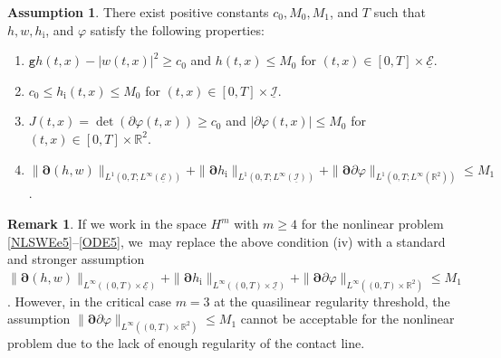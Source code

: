 \documentclass[JEP,XML,SOM,Unicode,NoFloatCountersInSection,published]{cedram}
\newenvironment{enumeratei}
{\bgroup\def\theenumi{\roman{enumi}}\def\theenumii{\arabic{enumii}}\begin{enumerate}}
{\end{enumerate}\egroup}
\newcommand{\gr}{{\mathtt g}}
\newcommand{\R}{{\mathbb R}}
\newcommand{\cI}{{\mathcal I}}
\newcommand{\cE}{{\mathcal E}}
\newcommand{\ul}[1]{\underline{#1}}
\theoremstyle{definition}
\newtheorem{assumption}[theorem]{Assumption}
\newtheorem{remark}[theorem]{Remark}
\begin{document}
\begin{assumption}\label{ass:LP}
There exist positive constants $c_0, M_0,M_1$, and $T$ such that $h,w,h_\mathrm{i}$, and $\varphi$ satisfy the following properties:
\begin{enumeratei}
\item\label{ass:LPi}
$\gr h(t,x)-|w(t,x)|^2\geq c_0$ and $h(t,x)\leq M_0$ for $(t,x)\in[0,T]\times\ul{\cE}$.
\item\label{ass:LPii}
$c_0 \leq h_\mathrm{i}(t,x) \leq M_0$ for $(t,x)\in[0,T]\times\ul{\cI}$.
\item\label{ass:LPiii}
$J(t,x)=\det(\partial\varphi(t,x))\geq c_0$ and $|\partial\varphi(t,x)|\leq M_0$ for $(t,x)\in[0,T]\times\R^2$.
\item\label{ass:LPiv}
$\|\bm{\partial}(h,w)\|_{L^1(0,T;L^\infty(\ul{\cE}))} + \|\bm{\partial} h_\mathrm{i}\|_{L^1(0,T;L^\infty(\ul{\cI}))}
+ \|\bm{\partial}\partial\varphi\|_{L^1(0,T;L^\infty(\R^2))} \leq M_1$.
\end{enumeratei}
\end{assumption}

\begin{remark}
If we work in the space $H^m$ with $m\geq4$ for the nonlinear problem \eqref{NLSWEe5}--\eqref{ODE5}, we~may replace the above condition {\rm (iv)}
with a standard and stronger assumption $\|\bm{\partial}(h,w)\|_{L^\infty((0,T)\times\ul{\cE})} + \|\bm{\partial} h_\mathrm{i}\|_{L^\infty((0,T)\times\ul{\cI})}
+ \|\bm{\partial}\partial\varphi\|_{L^\infty((0,T)\times\R^2)} \leq M_1$.
However, in the critical case $m=3$ at the quasilinear regularity threshold, the assumption $\|\bm{\partial}\partial\varphi\|_{L^\infty((0,T)\times\R^2)} \leq M_1$
cannot be acceptable for the nonlinear problem due to the lack of enough regularity of the contact line.
\end{remark}
\end{document}

